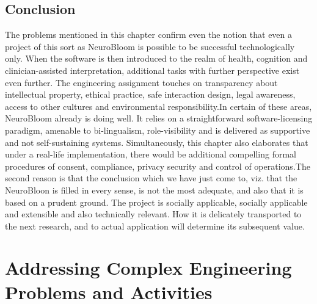 \documentclass[12pt,a4paper]{report}
\begin{document}
\section{Conclusion}
The problems mentioned in this chapter confirm even the notion that even a project of this sort as NeuroBloom is possible to be successful technologically only. When the software is then introduced to the realm of health, cognition and clinician-assisted interpretation, additional tasks with further perspective exist even further. The engineering assignment touches on transparency about intellectual property, ethical practice, safe interaction design, legal awareness, access to other cultures and environmental responsibility.In certain of these areas, NeuroBloom already is doing well. It relies on a straightforward software-licensing paradigm, amenable to bi-lingualism, role-visibility and is delivered as supportive and not self-sustaining systems. Simultaneously, this chapter also elaborates that under a real-life implementation, there would be additional compelling formal procedures of consent, compliance, privacy security and control of operations.The second reason is that the conclusion which we have just come to, viz. that the NeuroBloon is filled in every sense, is not the most adequate, and also that it is based on a prudent ground. The project is socially applicable, socially applicable and extensible and also technically relevant. How it is delicately transported to the next research, and to actual application will determine its subsequent value.

\chapter{Addressing Complex Engineering Problems and Activities}
\end{document}
